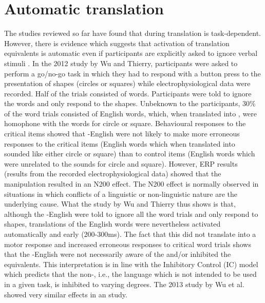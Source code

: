 \documentclass[output=paper]{LSP/langsci}
\begin{document}
\section{Automatic translation}

The studies reviewed so far have found that  during translation is task-dependent. However, there is evidence which suggests that activation of translation equivalents is automatic even if participants are explicitly asked to ignore verbal stimuli \citep{Wu2012,Wu2013}. In the 2012 study by Wu and Thierry, participants were asked to perform a go\slash no-go task in which they had to respond with a button press to the presentation of shapes (circles or squares) while electrophysiological data were recorded. Half of the trials consisted of words. Participants were told to ignore the words and only respond to the shapes. Unbeknown to the participants, 30\% of the word trials consisted of English words, which, when translated into , were homophone with the  words for circle or square. Behavioural responses to the critical items showed that -English  were not likely to make more erroneous responses to the critical items (English words which when translated into  sounded like either circle or square) than to control items (English words which were unrelated to the  sounds for circle and square). However, ERP results (results from the recorded electrophysiological data) showed that the manipulation resulted in an N200 effect. The N200 effect is normally observed in situations in which conflicts of a linguistic or non-linguistic nature are the underlying cause. What the study by Wu and Thierry thus shows is that, although the -English  were told to ignore all the word trials and only respond to shapes,  translations of the English words were nevertheless activated automatically and early (200-300ms). The fact that this did not translate into a motor response and increased erroneous responses to critical word trials shows that the -English  were not necessarily aware of the  and\slash or inhibited the  equivalents. This interpretation is in line with the Inhibitory Control (IC) model \citep{Green2003} which predicts that the non-, i.e., the language which is not intended to be used in a given task, is inhibited to varying degrees. The 2013 study by Wu et al. showed very similar effects in an  study.
\end{document}
